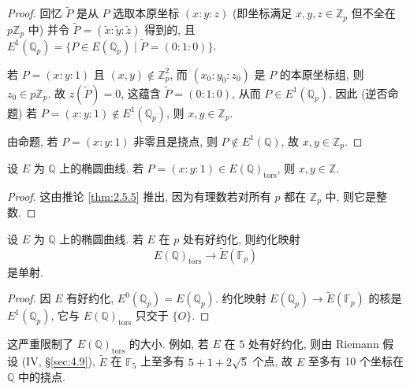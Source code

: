 \begin{proof}
回忆 $\tilde{P}$ 是从 $P$ 选取本原坐标 $(x:y:z)$ (即坐标满足 $x,y,z\in\mathbb{Z}_p$ 但不全在 $p\mathbb{Z}_p$ 中) 并令 $\tilde{P} = (\tilde{x}:\tilde{y}:\tilde{z})$ 得到的, 且 $E^1(\mathbb{Q}_p) = \{P\in E(\mathbb{Q}_p) \mid \tilde{P} = (0:1:0)\}$.

若 $P = (x:y:1)$ 且 $(x,y)\notin\mathbb{Z}_p^2$, 而 $(x_0:y_0:z_0)$ 是 $P$ 的本原坐标组, 则 $z_0\in p\mathbb{Z}_p$. 故 $z(\tilde{P}) = 0$, 这蕴含 $\tilde{P} = (0:1:0)$, 从而 $P\in E^1(\mathbb{Q}_p)$. 因此 (逆否命题) 若 $P = (x:y:1)\notin E^1(\mathbb{Q}_p)$, 则 $x, y\in\mathbb{Z}_p$.

由命题, 若 $P = (x:y:1)$ 非零且是挠点, 则 $P\notin E^1(\mathbb{Q})$, 故 $x, y\in\mathbb{Z}_p$.
\end{proof}

\begin{corollary} \label{thm:2.5.6} 
设 $E$ 为 $\mathbb{Q}$ 上的椭圆曲线. 若 $P = (x:y:1)\in E(\mathbb{Q})_{\mathrm{tors}}$, 则 $x, y\in\mathbb{Z}$.
\end{corollary}

\begin{proof}
这由推论 \ref{thm:2.5.5} 推出, 因为有理数若对所有 $p$ 都在 $\mathbb{Z}_p$ 中, 则它是整数.
\end{proof}

\begin{corollary} \label{thm:2.5.7} 
设 $E$ 为 $\mathbb{Q}$ 上的椭圆曲线. 若 $E$ 在 $p$ 处有好约化, 则约化映射
\[
E(\mathbb{Q})_{\mathrm{tors}}\to\tilde{E}(\mathbb{F}_p)
\]
是单射.
\end{corollary}

\begin{proof}
因 $E$ 有好约化, $E^0(\mathbb{Q}_p) = E(\mathbb{Q}_p)$. 约化映射 $E(\mathbb{Q}_p)\to\tilde{E}(\mathbb{F}_p)$ 的核是 $E^1(\mathbb{Q}_p)$, 它与 $E(\mathbb{Q})_{\mathrm{tors}}$ 只交于 $\{O\}$.
\end{proof}

\begin{remark} \label{thm:2.5.8} 
这严重限制了 $E(\mathbb{Q})_{\mathrm{tors}}$ 的大小. 例如, 若 $E$ 在 $5$ 处有好约化, 则由 Riemann 假设 (IV, \S\ref{sec:4.9}), $\tilde{E}$ 在 $\mathbb{F}_5$ 上至多有 $5 + 1 + 2\sqrt{5}$ 个点, 故 $E$ 至多有 10 个坐标在 $\mathbb{Q}$ 中的挠点.
\end{remark}

